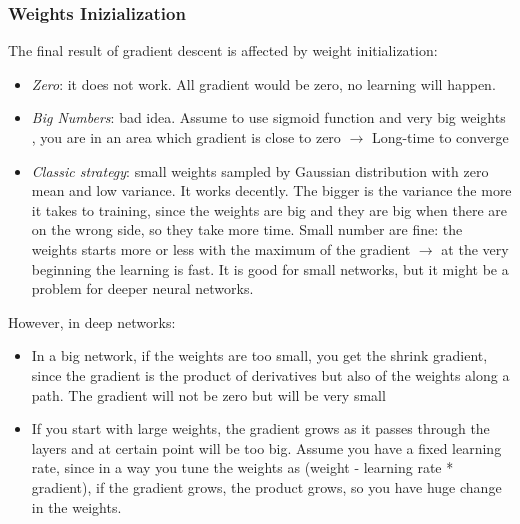 \subsubsection{Weights Inizialization}
The final result of gradient descent is affected by weight initialization:
\begin{itemize}
    \item \textit{Zero}: it does not work. All gradient would be zero, no learning will happen. 
    \item \textit{Big Numbers}: bad idea. Assume to use sigmoid function and very big weights , you are in an area which gradient is close to zero $\rightarrow$ Long-time to converge
    \item \textit{Classic strategy}: small weights sampled by Gaussian distribution with zero mean and low variance. It works decently. The bigger is the variance the more it takes to training, since the weights are big and they are big when there are on the wrong side, so they take more time. Small number are fine: the weights starts more or less with the maximum of the gradient $\rightarrow$ at the very beginning the learning is fast. It is good for small networks, but it might be a problem for deeper neural networks.
\end{itemize}{}

However, in deep networks:
\begin{itemize}
    \item In a big network, if the weights are too small, you get the shrink gradient, since the gradient is the product of derivatives but also of the weights along a path. The gradient will not be zero but will be very small
    \item If you start with large weights, the gradient grows as it passes through the layers and at certain point will be too big. Assume you have a fixed learning rate, since in a way you tune the weights as (weight - learning rate * gradient), if the gradient grows, the product grows, so you have huge change in the weights. 
\end{itemize}{}

